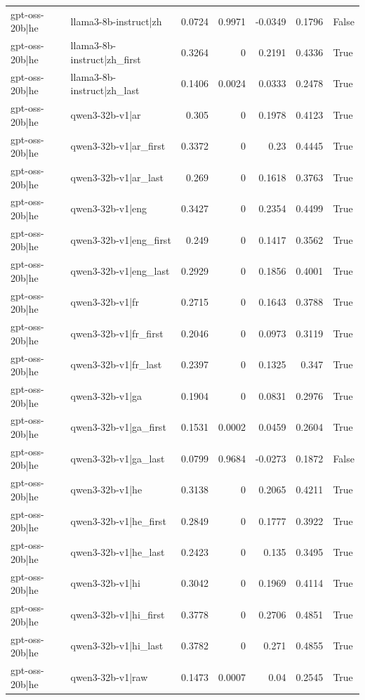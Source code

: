 \begin{table}
\begin{tabular}{l l r r r r l}
gpt-oss-20b|he & llama3-8b-instruct|zh & 0.0724 & 0.9971 & -0.0349 & 0.1796 & False \\
gpt-oss-20b|he & llama3-8b-instruct|zh_first & 0.3264 & 0 & 0.2191 & 0.4336 & True \\
gpt-oss-20b|he & llama3-8b-instruct|zh_last & 0.1406 & 0.0024 & 0.0333 & 0.2478 & True \\
gpt-oss-20b|he & qwen3-32b-v1|ar & 0.305 & 0 & 0.1978 & 0.4123 & True \\
gpt-oss-20b|he & qwen3-32b-v1|ar_first & 0.3372 & 0 & 0.23 & 0.4445 & True \\
gpt-oss-20b|he & qwen3-32b-v1|ar_last & 0.269 & 0 & 0.1618 & 0.3763 & True \\
gpt-oss-20b|he & qwen3-32b-v1|eng & 0.3427 & 0 & 0.2354 & 0.4499 & True \\
gpt-oss-20b|he & qwen3-32b-v1|eng_first & 0.249 & 0 & 0.1417 & 0.3562 & True \\
gpt-oss-20b|he & qwen3-32b-v1|eng_last & 0.2929 & 0 & 0.1856 & 0.4001 & True \\
gpt-oss-20b|he & qwen3-32b-v1|fr & 0.2715 & 0 & 0.1643 & 0.3788 & True \\
gpt-oss-20b|he & qwen3-32b-v1|fr_first & 0.2046 & 0 & 0.0973 & 0.3119 & True \\
gpt-oss-20b|he & qwen3-32b-v1|fr_last & 0.2397 & 0 & 0.1325 & 0.347 & True \\
gpt-oss-20b|he & qwen3-32b-v1|ga & 0.1904 & 0 & 0.0831 & 0.2976 & True \\
gpt-oss-20b|he & qwen3-32b-v1|ga_first & 0.1531 & 0.0002 & 0.0459 & 0.2604 & True \\
gpt-oss-20b|he & qwen3-32b-v1|ga_last & 0.0799 & 0.9684 & -0.0273 & 0.1872 & False \\
gpt-oss-20b|he & qwen3-32b-v1|he & 0.3138 & 0 & 0.2065 & 0.4211 & True \\
gpt-oss-20b|he & qwen3-32b-v1|he_first & 0.2849 & 0 & 0.1777 & 0.3922 & True \\
gpt-oss-20b|he & qwen3-32b-v1|he_last & 0.2423 & 0 & 0.135 & 0.3495 & True \\
gpt-oss-20b|he & qwen3-32b-v1|hi & 0.3042 & 0 & 0.1969 & 0.4114 & True \\
gpt-oss-20b|he & qwen3-32b-v1|hi_first & 0.3778 & 0 & 0.2706 & 0.4851 & True \\
gpt-oss-20b|he & qwen3-32b-v1|hi_last & 0.3782 & 0 & 0.271 & 0.4855 & True \\
gpt-oss-20b|he & qwen3-32b-v1|raw & 0.1473 & 0.0007 & 0.04 & 0.2545 & True \\

\end{tabular}
\end{table}
